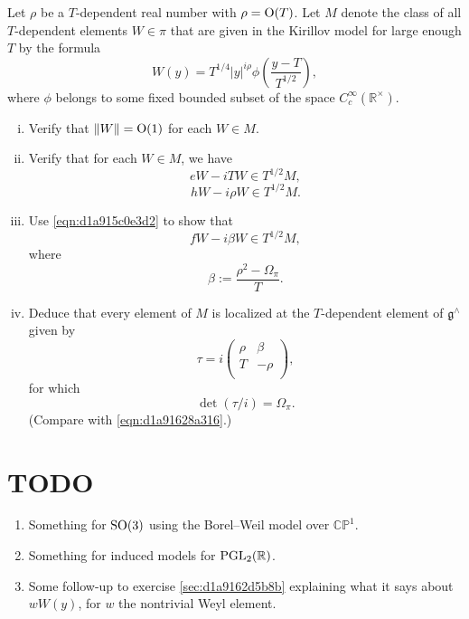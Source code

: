 \documentclass[reqno]{amsart} 
\numberwithin{equation}{section}
\numberwithin{theorem}{section}
\begin{document}
\begin{exercise}
  Let $\rho$ be a $T$-dependent real number with $\rho = \operatorname{O}(T)$.  Let $M$ denote the class of all $T$-dependent elements $W \in \pi$ that are given in the Kirillov model for large enough $T$ by the formula
  \begin{equation*}
    W(y) =
    T^{1/4}
    \lvert y \rvert^{i \rho }
    \phi \left( \frac{y - T}{T^{1/2} } \right),
  \end{equation*}
  where $\phi$ belongs to some fixed bounded subset of the space $C_c^\infty(\mathbb{R}^\times)$.
  \begin{enumerate}[(i)]
  \item Verify that $\lVert W \rVert = \operatorname{O}(1)$ for each $W \in M$.
  \item Verify that for each $W \in M$, we have
    \begin{equation*}
      e W - i T W \in T^{1/2} M,
    \end{equation*}
    \begin{equation*}
      h W
      - i \rho W
      \in T^{1/2} M.
    \end{equation*}
  \item Use \eqref{eqn:d1a915c0e3d2} to show that
    \begin{equation*}
      f W - i \beta W \in T^{1/2} M,
    \end{equation*}
    where
    \begin{equation*}
      \beta := \frac{\rho^2 - \Omega_\pi}{T}.
    \end{equation*}    
  \item Deduce that every element of $M$ is localized at the $T$-dependent element of $\mathfrak{g}^\wedge$ given by
    \begin{equation*}
      \tau = i 
      \begin{pmatrix}
        \rho  & \beta \\
        T  & -\rho \\
      \end{pmatrix},
    \end{equation*}
    for which
    \begin{equation*}
      \det (\tau/i) = \Omega_\pi.
    \end{equation*}
    (Compare with \eqref{eqn:d1a91628a316}.)
  \end{enumerate}
\end{exercise}

\section{TODO}

\begin{enumerate}
\item Something for $\operatorname{SO}(3)$ using the Borel--Weil model over $\mathbb{C} \mathbb{P}^1$. 
\item Something for induced models for $\operatorname{PGL}_2(\mathbb{R})$.
\item Some follow-up to exercise \ref{sec:d1a9162d5b8b} explaining what it says about $w W(y)$, for $w$ the nontrivial Weyl element.
\end{enumerate}



{} 
\end{document}
